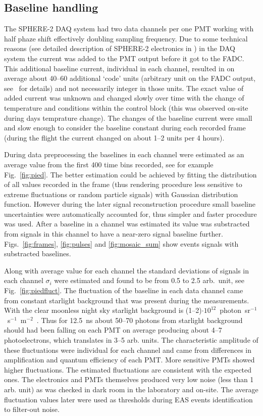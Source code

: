\documentclass[final,5p,times,twocolumn]{elsarticle}
\begin{document}
\subsection{Baseline handling}

The \mbox{SPHERE-2} DAQ system had two data channels per one PMT working with half phaze shift effectively doubling sampling frequency. Due to some technical reasons (see detailed description of \mbox{SPHERE-2} electronics in \cite{ant15a}) in the DAQ system the current was added to the PMT output before it got to the FADC. This additional baseline current, individual in each channel, resulted in on average about 40--60 additional `code' units (arbitrary unit on the FADC output, see~\cite{ant16} for details) and not necessarily integer in those units. The exact value of added current was unknown and changed slowly over time with the change of temperature and conditions within the control block (this was observed on-site during days temprature change). The changes of the baseline current were small and slow enough to consider the baseline constant during each recorded frame (during the flight the current changed on about 1--2 units per 4 hours). 

During data preprocessing the baselines in each channel were estimated as an average value from the first 400 time bins recorded, see for example Fig.~\ref{fig:pied}. The better estimation could be achieved by fitting the distribution of all values recorded in the frame (thus rendering procedure less sensitive to extreme fluctuations or random particle signals) with Gaussian distribution function. However during the later signal reconstruction procedure small baseline uncertainties were automatically accounted for, thus simpler and faster procedure was used. After a baseline in a channel was estimated its value was substracted from signals in this channel to have a near-zero signal baseline further. Figs.~\ref{fig:frames}, \ref{fig:pulses} and \ref{fig:mosaic_sum} show events signals with substracted baselines.

Along with average value for each channel the standard deviations of signals in each channel $\sigma_i$ were estimated and found to be from 0.5 to 2.5 arb.~unit, see  Fig.~\ref{fig:piedfluct}. The fluctuation of the baseline in each data channel came from constant starlight background that was present during the measurements. With the clear moonless night sky starlight background is (1--2)$\cdot10^{12}$~photon~sr$^{-1}$~s$^{-1}$~m$^{-2}$~\cite{starlightbackground}. Thus for 12.5~ns about 50--70 photons from starlight background should had been falling on each PMT on average producing about 4--7 photoelectrons, which translates in 3--5 arb. units. The characteristic amplitude of these fluctuations were individual for each channel and came from differences in amplification and quantum efficiency of each PMT. More sensitive PMTs showed higher fluctuations. The estimated fluctuations are consistent with the expected ones. The electronics and PMTs themselves produced very low noise (less than 1 arb. unit) as was checked in dark room in the laboratory and on-site. The average fluctuation values later were used as thresholds during EAS events identification to filter-out noise. 
\end{document}
